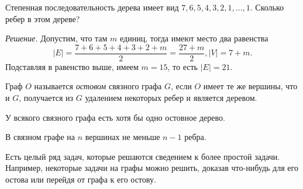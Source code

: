 \begin{example}
	Степенная последовательность дерева имеет вид $7, 6, 5, 4, 3, 2, 1, \dots, 1$. Сколько ребер в этом дереве?

	\emph{Решение.} Допустим, что там $m$ единиц, тогда имеют место два равенства
	$$|E| = \frac{7 + 6 + 5 + 4 + 3 + 2 + m}{2} = \frac{27 + m}{2}, |V| = 7 + m.$$
	Подставляя в равенство выше, имеем $m = 15$, то есть $|E| = 21$.
\end{example}	

\begin{definition}
	Граф $O$ называется \emph{остовом} связного графа $G$, если $O$ имеет те же вершины, что и $G$, получается из $G$ удалением некоторых ребер и является деревом.
\end{definition}

\begin{statement}
	У всякого связного графа есть хотя бы одно остовное дерево.
\end{statement}

\begin{consequence}
	В связном графе на $n$ вершинах не меньше $n-1$ ребра.
\end{consequence}
	Есть целый ряд задач, которые решаются сведением к более простой задачи. Например, некоторые задачи на графы можно решить, доказав что-нибудь для его остова или перейдя от графа к его остову.
	

